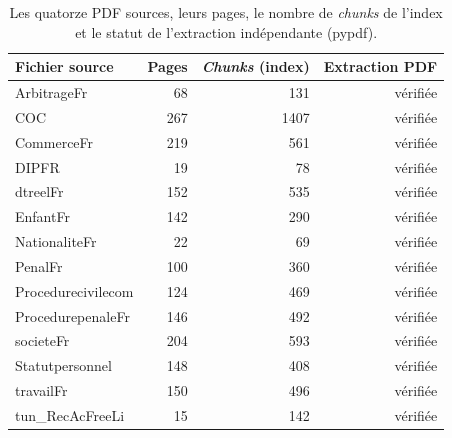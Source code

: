 \begin{table}[H]
\centering
\small
\begin{tabular}{lrrr}
\toprule
Fichier source & Pages & \emph{Chunks} (index) & Extraction PDF \\
\midrule
ArbitrageFr & 68 & 131 & vérifiée \\
COC & 267 & 1407 & vérifiée \\
CommerceFr & 219 & 561 & vérifiée \\
DIPFR & 19 & 78 & vérifiée \\
dtreelFr & 152 & 535 & vérifiée \\
EnfantFr & 142 & 290 & vérifiée \\
NationaliteFr & 22 & 69 & vérifiée \\
PenalFr & 100 & 360 & vérifiée \\
Procedurecivilecom & 124 & 469 & vérifiée \\
ProcedurepenaleFr & 146 & 492 & vérifiée \\
societeFr & 204 & 593 & vérifiée \\
Statutpersonnel & 148 & 408 & vérifiée \\
travailFr & 150 & 496 & vérifiée \\
tun\_RecAcFreeLi & 15 & 142 & vérifiée \\
\bottomrule
\end{tabular}
\caption{Les quatorze PDF sources, leurs pages, le nombre de \emph{chunks} de l'index et le statut de l'extraction indépendante (pypdf).}
\label{tab:corpus}
\end{table}
